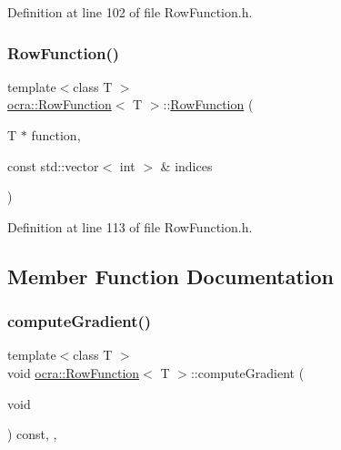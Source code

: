 Definition at line 102 of file Row\+Function.\+h.

\hypertarget{classocra_1_1RowFunction_a19b2063d4ec61b91fdd8793321414f7d}{}\label{classocra_1_1RowFunction_a19b2063d4ec61b91fdd8793321414f7d} 
\subsubsection{\texorpdfstring{Row\+Function()}{RowFunction()}\hspace{0.1cm}{\footnotesize\ttfamily [2/2]}}
{\footnotesize\ttfamily template$<$class T $>$ \\
\hyperlink{classocra_1_1RowFunction}{ocra\+::\+Row\+Function}$<$ T $>$\+::\hyperlink{classocra_1_1RowFunction}{Row\+Function} (\begin{DoxyParamCaption}\item[{T $\ast$}]{function,  }\item[{const std\+::vector$<$ int $>$ \&}]{indices }\end{DoxyParamCaption})\hspace{0.3cm}{\ttfamily [inline]}}



Definition at line 113 of file Row\+Function.\+h.



\subsection{Member Function Documentation}
\hypertarget{classocra_1_1RowFunction_a3d32e6e76f2f4aed5630e0a59cf08756}{}\label{classocra_1_1RowFunction_a3d32e6e76f2f4aed5630e0a59cf08756} 
\subsubsection{\texorpdfstring{compute\+Gradient()}{computeGradient()}}
{\footnotesize\ttfamily template$<$class T $>$ \\
void \hyperlink{classocra_1_1RowFunction}{ocra\+::\+Row\+Function}$<$ T $>$\+::compute\+Gradient (\begin{DoxyParamCaption}\item[{void}]{ }\end{DoxyParamCaption}) const\hspace{0.3cm}{\ttfamily [inline]}, {\ttfamily [protected]}, {\ttfamily [virtual]}}



